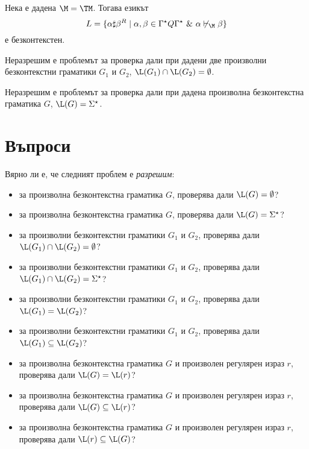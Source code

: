 \begin{lemma}
  Нека е дадена $\M = \TM$.
  Тогава езикът 
  \[L = \{\alpha\sharp\beta^R \mid \alpha,\beta \in \Gamma^\star Q \Gamma^\star\ \&\  \alpha \not\vdash_\M \beta\}\]
  е безконтекстен.
\end{lemma}


\begin{thm}
  Неразрешим е проблемът за проверка дали при дадени две произволни безконтекстни граматики $G_1$ и $G_2$,
  $\L(G_1) \cap \L(G_2) = \emptyset$.  
\end{thm}

\begin{thm}
  Неразрешим е проблемът за проверка дали при дадена произволна безконтекстна граматика $G$,
  $\L(G) = \Sigma^\star$.  
\end{thm}


\section{Въпроси}

Вярно ли е, че следният проблем е {\em разрешим}:
\begin{itemize}
\item
  за произволна безконтекстна граматика $G$, проверява дали $\L(G) = \emptyset$?
\item
  за произволна безконтекстна граматика $G$, проверява дали $\L(G) = \Sigma^\star$?
\item
  за произволни безконтекстни граматики $G_1$ и $G_2$, проверява дали $\L(G_1) \cap \L(G_2) = \emptyset$?
\item
  за произволни безконтекстни граматики $G_1$ и $G_2$, проверява дали $\L(G_1) \cap \L(G_2) = \Sigma^\star$?
\item
  за произволни безконтекстни граматики $G_1$ и $G_2$, проверява дали $\L(G_1) = \L(G_2)$?
\item
  за произволни безконтекстни граматики $G_1$ и $G_2$, проверява дали $\L(G_1) \subseteq \L(G_2)$?
\item
  за произволна безконтекстна граматика $G$ и произволен регулярен израз $r$,
  проверява дали $\L(G) = \L(r)$?
\item
  за произволна безконтекстна граматика $G$ и произволен регулярен израз $r$,
  проверява дали $\L(G) \subseteq \L(r)$?
\item
  за произволна безконтекстна граматика $G$ и произволен регулярен израз $r$,
  проверява дали $\L(r) \subseteq \L(G)$?
\end{itemize}

